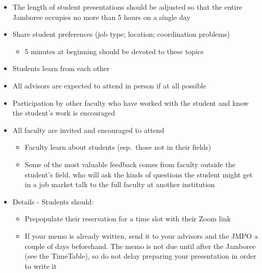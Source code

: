 \documentclass{scrartcl}
\begin{document}
\begin{itemize}
\item The length of student presentations should be adjusted so that the entire Jamboree occupies no more than 5 hours on a single day
\item Share student preferences (job type; location; coordination problems)
  \begin{itemize}
  \item 5 minutes at beginning should be devoted to these topics
  \end{itemize}
\item Students learn from each other
\item All advisors are expected to attend in person if at all possible
\item Participation by other faculty who have worked with the student and know the student's work is encouraged
\item All faculty are invited and encouraged to attend
  \begin{itemize}
  \item Faculty learn about students (esp.\ those not in their fields)
  \item Some of the most valuable feedback comes from faculty outside the student's field, who will ask the kinds of questions the student might get in a job market talk to the full faculty at another institution
  \end{itemize}

\item{Details - Students should:}
  \begin{itemize}
  \item Prepopulate their reservation for a time slot with their Zoom link
    \item If your memo is already written, send it to your advisors and the JMPO a couple of days beforehand.  The memo is not due until after the Jamboree (see the TimeTable), so do not delay preparing your presentation in order to write it 
  \end{itemize}
\end{itemize}
\end{document}
